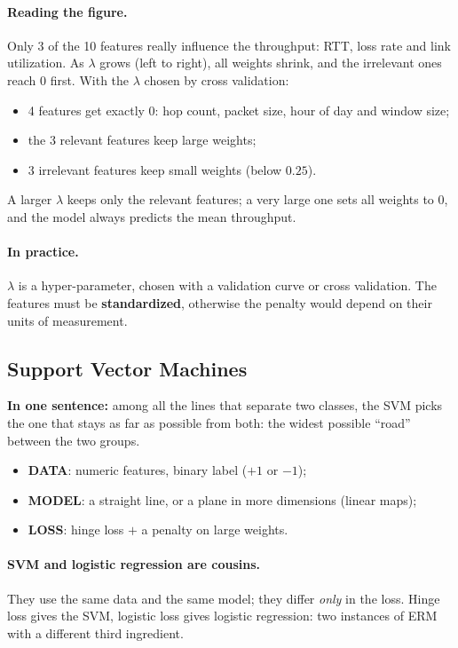 \paragraph{Reading the figure.} Only 3 of the 10 features really influence the throughput: RTT, loss rate and link utilization. As $\lambda$ grows (left to right), all weights shrink, and the irrelevant ones reach 0 first. With the $\lambda$ chosen by cross validation:
\begin{itemize}
    \item 4 features get exactly 0: hop count, packet size, hour of day and window size;
    \item the 3 relevant features keep large weights;
    \item 3 irrelevant features keep small weights (below $0.25$).
\end{itemize}
A larger $\lambda$ keeps only the relevant features; a very large one sets all weights to 0, and the model always predicts the mean throughput.

\paragraph{In practice.} $\lambda$ is a hyper-parameter, chosen with a validation curve or cross validation. The features must be \textbf{standardized}, otherwise the penalty would depend on their units of measurement.

\subsection{Support Vector Machines}
\textbf{In one sentence:} among all the lines that separate two classes, the SVM picks the one that stays as far as possible from both: the widest possible ``road'' between the two groups.

\begin{itemize}
    \item \textbf{DATA}: numeric features, binary label ($+1$ or $-1$);
    \item \textbf{MODEL}: a straight line, or a plane in more dimensions (linear maps);
    \item \textbf{LOSS}: hinge loss $+$ a penalty on large weights.
\end{itemize}

\paragraph{SVM and logistic regression are cousins.} They use the same data and the same model; they differ \emph{only} in the loss. Hinge loss gives the SVM, logistic loss gives logistic regression: two instances of ERM with a different third ingredient.

